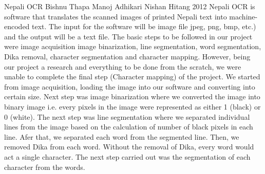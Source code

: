  \begin{conf-abstract}[]
{Nepali OCR}
{
	Bishnu Thapa
	Manoj Adhikari
	Nishan Hitang
}
{2012}
Nepali OCR is software that translates the scanned images of printed
Nepali text into machine-encoded text. The input for the software will be
image file jpeg, png, bmp, etc.) and the output will be a text file.
The basic steps to be followed in our project were image acquisition
image binarization, line segmentation, word segmentation, Dika removal,
character segmentation and character mapping. However, being our
project a research and everything to be done from the scratch, we were
unable to complete the final step (Character mapping) of the project.
We started from image acquisition, loading the image into our software
and converting into certain size. Next step was image binarization where
we converted the image into binary image i.e. every pixels in the image
were represented as either 1 (black) or 0 (white). The next step was line
segmentation where we separated individual lines from the image based
on the calculation of number of black pixels in each line. Afer that, we
separated each word from the segmented line. Then, we removed Dika
from each word. Without the removal of Dika, every word would act a
single character. The next step carried out was the segmentation of each
character from the words.
  \end{conf-abstract}